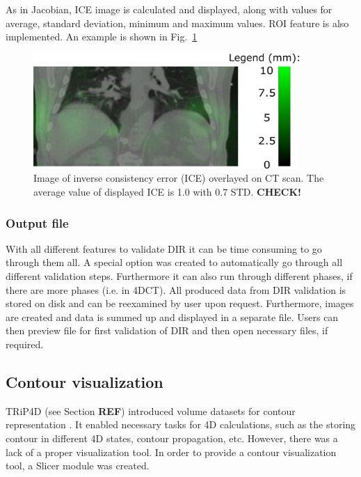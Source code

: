 \documentclass[type=dr, dr=rernat, accentcolor=tud7b,colorbacktitle, bigchapter, openright, twoside, 12pt ]{tudthesis}
\begin{document}
As in Jacobian, ICE image is calculated and displayed, along with values for average, standard deviation, minimum and maximum values. ROI feature is also implemented. An example is shown in Fig.~\ref{inv}

\begin{figure}[H]
\begin{center}
\includegraphics[width=0.9\textwidth]{./Images/inv.png}
\caption{Image of inverse consistency error (ICE) overlayed on CT scan. The average value of displayed ICE is 1.0 with 0.7 STD. \textbf{CHECK!}}
\label{inv}
\end{center}
\end{figure}


\subsubsection{Output file}

With all different features to validate DIR it can be time consuming to go through them all. A special option was created to automatically go through all different validation steps. Furthermore it can also run through different phases, if there are more phases (i.e. in 4DCT). All produced data from DIR validation is stored on disk and can be reexamined by user upon request. Furthermore, images are created and data is summed up and displayed in a separate file. Users can then preview file for first validation of DIR and then open necessary files, if required.

\subsection{Contour visualization}
\label{Contour}

TRiP4D (see Section \textbf{REF}) introduced volume datasets for contour representation \cite{Richter2012}. It enabled necessary tasks for 4D calculations, such as the storing contour in different 4D states, contour propagation, etc. However, there was a lack of a proper visualization tool. In order to provide a contour visualization tool, a Slicer module was created. 
\end{document}
